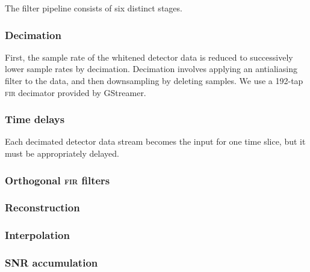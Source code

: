 The filter pipeline consists of six distinct stages.

\subsubsection{Decimation}

First, the sample rate of the whitened detector data is reduced to successively
lower sample rates by decimation.  Decimation involves applying an antialiasing
filter to the data, and then downsampling by deleting samples.  We use a
192-tap \textsc{fir} decimator provided by GStreamer.

\subsubsection{Time delays}

Each decimated detector data stream becomes the input for one time slice, but
it must be appropriately delayed.

\subsubsection{Orthogonal \textsc{fir} filters}

\subsubsection{Reconstruction}

\subsubsection{Interpolation}

\subsubsection{SNR accumulation}

